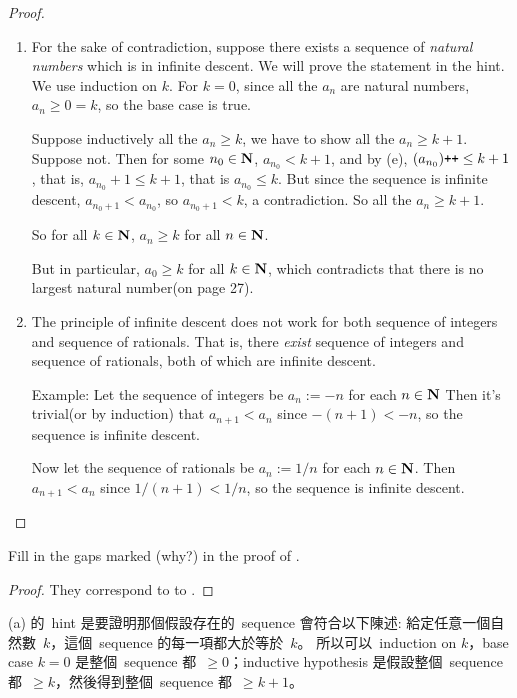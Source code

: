 \begin{proof}
\begin{enumerate}
    \item
        For the sake of contradiction, suppose there exists a sequence of \emph{natural numbers} which is in infinite descent.
        We will prove the statement in the hint.
        We use induction on \(k\).
        For \(k = 0\), since all the \(a_n\) are natural numbers, \(a_n \ge 0 = k\), so the base case is true.
        
        Suppose inductively all the \(a_n \ge k\), we have to show all the \(a_n \ge k + 1\).
        Suppose not.
        Then for some \(n_0 \in \mathbf{N}\), \(a_{n_0} < k + 1\), and by (e), \((a_{n_0})\texttt{++} \le k + 1\), that is, \(a_{n_0} + 1 \le k + 1\), that is \(a_{n_0} \le k\).
        But since the sequence is infinite descent, \(a_{n_0 + 1} < a_{n_0}\), so \(a_{n_0 + 1} < k\), a contradiction.
        So all the \(a_n \ge k + 1\).

        So for all \(k \in \mathbf{N}\), \(a_n \ge k\) for all \(n \in \mathbf{N}\).
        
        But in particular, \(a_0 \ge k\) for all \(k \in \mathbf{N}\), which contradicts that there is no largest natural number(on page 27).
    \item
        The principle of infinite descent does not work for both sequence of integers and sequence of rationals.
        That is, there \emph{exist} sequence of integers and sequence of rationals, both of which are infinite descent.

        Example: Let the sequence of integers be \(a_n := -n\) for each \(n \in \mathbf{N}\)
        Then it's trivial(or by induction) that \(a_{n + 1} < a_n\) since \(-(n + 1) < -n\), so the sequence is infinite descent.

        Now let the sequence of rationals be \(a_n := 1/n\) for each \(n \in \mathbf{N}\).
        Then \(a_{n + 1} < a_n\) since \(1/(n + 1) < 1/n\), so the sequence is infinite descent.
\end{enumerate}
\end{proof}

\begin{exercise} \label{exercise 4.4.3}
Fill in the gaps marked (why?) in the proof of .
\end{exercise}

\begin{proof}
They correspond to  to .
\end{proof}

\begin{note}
(a) 的\ hint 是要證明那個假設存在的\ sequence 會符合以下陳述: 給定任意一個自然數\ \(k\)，這個\ sequence 的每一項都大於等於\ \(k\)。
所以可以\ induction on \(k\)，base case \(k = 0\) 是整個\ sequence 都\ \(\ge 0\)；inductive hypothesis 是假設整個\ sequence 都\ \(\ge k\)，然後得到整個\ sequence 都\ \(\ge k + 1\)。
\end{note}